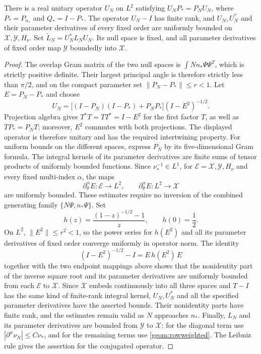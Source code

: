 \begin{lemma}\label{geom:frame}
There is a real unitary operator $U_N$ on $L^2$ satisfying
$U_NP_*=P_NU_N$, where $P_*=P_{n_*}$ and $Q_*=I-P_*$.
The operator $U_N-I$ has finite rank, and $U_N,U_N^*$ and their parameter
derivatives of every fixed order are uniformly bounded on
$\mathcal X,\mathcal Y,H_\nu$.
Set $\widetilde L_N=U_N^*L_NU_N$. Its null space is fixed, and
all parameter derivatives of fixed order map $\mathcal Y$ boundedly into
$\mathcal X$.
\end{lemma}
\begin{proof}
The overlap Gram matrix of the two null spaces is
$\int Nn_*\Psi\Psi^T$, which is strictly positive definite.
Their largest principal angle is therefore strictly less than $\pi/2$,
and on the compact parameter set $\|P_N-P_*\|\le r<1$.
Let $E=P_N-P_*$ and choose
\[
 U_N=\big[(I-P_N)(I-P_*)+P_NP_*\big](I-E^2)^{-1/2}.
\]
Projection algebra gives $T^*T=TT^*=I-E^2$ for the first factor $T$,
as well as $TP_*=P_NT$; moreover, $E^2$ commutes with both projections.
The displayed operator is therefore unitary and has the required
intertwining property.
For uniform bounds on the different spaces, express $P_N$ by its
five-dimensional Gram formula. The integral kernels of its parameter
derivatives are finite sums of tensor products of uniformly bounded functions.
Since $\nu_*^{-1}\in L^1$, for
$\mathcal E=\mathcal X,\mathcal Y,H_\nu$ and every fixed multi-index
$\alpha$, the maps
\[
 \partial_\theta^\alpha E:\mathcal E\longrightarrow L^2,
 \qquad
 \partial_\theta^\alpha E:L^2\longrightarrow\mathcal X
\]
are uniformly bounded. These estimates require no inversion of the
combined generating family $\{N\Psi,n_*\Psi\}$.
Set
\[
 h(z)=\frac{(1-z)^{-1/2}-1}{z},\qquad h(0)=\frac12.
\]
On $L^2$, $\|E^2\|\le r^2<1$, so the power series for $h(E^2)$
and all its parameter derivatives of fixed order converge uniformly
in operator norm. The identity
\[
 (I-E^2)^{-1/2}-I=E\,h(E^2)\,E
\]
together with the two endpoint mappings above shows that the nonidentity
part of the inverse square root and its parameter derivatives are
uniformly bounded from each $\mathcal E$ to $\mathcal X$.
Since $\mathcal X$ embeds continuously into all three spaces and $T-I$
has the same kind of finite-rank integral kernel, $U_N,U_N^*$ and all
the specified parameter derivatives have the asserted bounds.
Their nonidentity parts have finite rank, and the estimates remain
valid as $N$ approaches $n_*$.
Finally, $L_N$ and its parameter derivatives are bounded from
$\mathcal Y$ to $\mathcal X$: for the diagonal term use
$|\partial^\alpha\nu_N|\le C\nu_*$, and for the remaining terms use
\eqref{geom:rowweighted}. The Leibniz rule gives the assertion for the
conjugated operator.
\end{proof}

